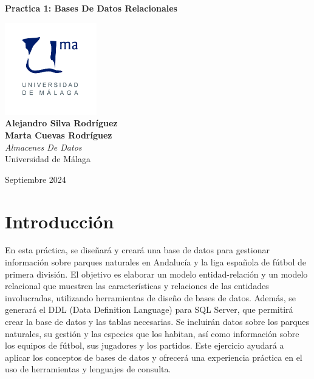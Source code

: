 \documentclass{article}
\begin{document}
\begin{titlepage}
	\centering
	\vspace*{3cm}
	
	{\Huge \textbf{Practica 1: Bases De Datos Relacionales}\\[0.5cm]}
	
	\vspace{2cm}
	\includegraphics[width=0.3\textwidth]{images/uma_logo.jpg}\\[1cm]
	
	{\LARGE \textbf{Alejandro Silva Rodríguez}\\[0.5cm]}
	{\LARGE \textbf{Marta Cuevas Rodríguez}\\[0.5cm]}
	{\large \textit{Almacenes De Datos}\\
		Universidad de Málaga\\
		}
	
	\vfill
	
	{\large Septiembre 2024}
\end{titlepage}

\tableofcontents

\newpage

\section{Introducción}

En esta práctica, se diseñará y creará una base de datos para gestionar información sobre parques naturales en Andalucía y la liga española de fútbol de primera división. El objetivo es elaborar un modelo entidad-relación y un modelo relacional que muestren las características y relaciones de las entidades involucradas, utilizando herramientas de diseño de bases de datos. Además, se generará el DDL (Data Definition Language) para SQL Server, que permitirá crear la base de datos y las tablas necesarias. Se incluirán datos sobre los parques naturales, su gestión y las especies que los habitan, así como información sobre los equipos de fútbol, sus jugadores y los partidos. Este ejercicio ayudará a aplicar los conceptos de bases de datos y ofrecerá una experiencia práctica en el uso de herramientas y lenguajes de consulta.
\end{document}
